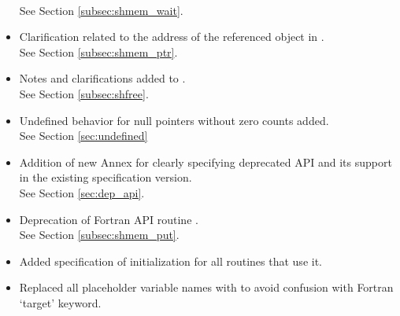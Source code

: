 \begin{itemize}
\\See Section \ref{subsec:shmem_wait}.
\item Clarification related to the address of the referenced object in .
\\See Section \ref{subsec:shmem_ptr}.
\item Notes and clarifications added to .
\\See Section \ref{subsec:shfree}.
\item Undefined behavior for null pointers without zero counts added.
\\See Section \ref{sec:undefined}
\item Addition of new Annex for clearly specifying deprecated API and its support in the existing specification version.
\\See Section \ref{sec:dep_api}.
\item Deprecation of Fortran API routine .
\\See Section \ref{subsec:shmem_put}. 
\item Added specification of  initialization for all routines that use it.
\item Replaced all placeholder variable names  with  to avoid confusion with Fortran `target' keyword.

\end{itemize}
